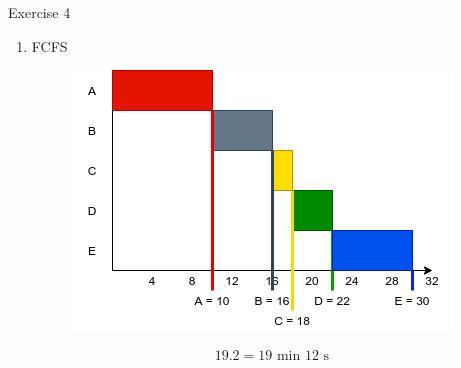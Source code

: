 \documentclass[10pt]{beamer}
\begin{document}
\begin{frame}{Exercise 4}
\begin{enumerate}
		 \item FCFS \\ \vspace{0.7cm}
        \begin{minipage}{0.49\textwidth}
            \begin{figure}
                    \includegraphics[keepaspectratio, width=\textwidth, height=\textheight]{img/fcfs.png} \\
                \end{figure}
        \end{minipage}\hfill \begin{minipage}{0.3\textwidth}
        \end{minipage} \vspace{0.7cm}
		 \alert{\[ 19.2 = 19\text{ min } 12\text{ s} \]}
		 \framebreak
		 

\end{enumerate}
\end{frame}
\end{document}
